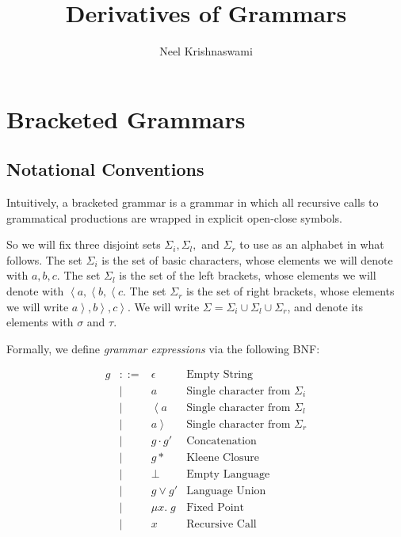 \documentclass{article}
\author{Neel Krishnaswami}
\title{Derivatives of Grammars}
\newcommand{\fix}[2]{\mu {#1}.\;{#2}}
\newcommand{\lft}[1]{\left<{#1}\right.}
\newcommand{\rgt}[1]{\left.{#1}\right>}
\begin{document}
\maketitle

\section{Bracketed Grammars}

\subsection{Notational Conventions}

Intuitively, a bracketed grammar is a grammar in which all recursive calls to
grammatical productions are wrapped in explicit open-close symbols.

So we will fix three disjoint sets $\Sigma_i, \Sigma_l,$ and $\Sigma_r$ to use
as an alphabet in what follows. The set $\Sigma_i$ is the set of basic
characters, whose elements we will denote with $a, b, c$.  The set $\Sigma_l$
is the set of the left brackets, whose elements we will denote with $\lft{a},
\lft{b}, \lft{c}$. The set $\Sigma_r$ is the set of right brackets, whose
elements we will write $\rgt{a}, \rgt{b}, \rgt{c}$. We will write $\Sigma =
\Sigma_i \cup \Sigma_l \cup \Sigma_r$, and denote its elements with $\sigma$
and $\tau$.

Formally, we define \emph{grammar expressions} via the following
BNF:

\begin{displaymath}
\begin{array}{lcll}
g & ::= & \epsilon   & \mbox{Empty String} \\
  &  |  & a          & \mbox{Single character from $\Sigma_i$} \\
  &  |  & \lft{a}    & \mbox{Single character from $\Sigma_l$} \\
  &  |  & \rgt{a}    & \mbox{Single character from $\Sigma_r$} \\
  &  |  & g \cdot g' & \mbox{Concatenation} \\ 
  &  |  & g*         & \mbox{Kleene Closure} \\
  &  |  & \bot       & \mbox{Empty Language} \\
  &  |  & g \vee g'  & \mbox{Language Union} \\
  &  |  & \fix{x}{g} & \mbox{Fixed Point} \\
  &  |  & x          & \mbox{Recursive Call} \\
\end{array}
\end{displaymath}
\end{document}
